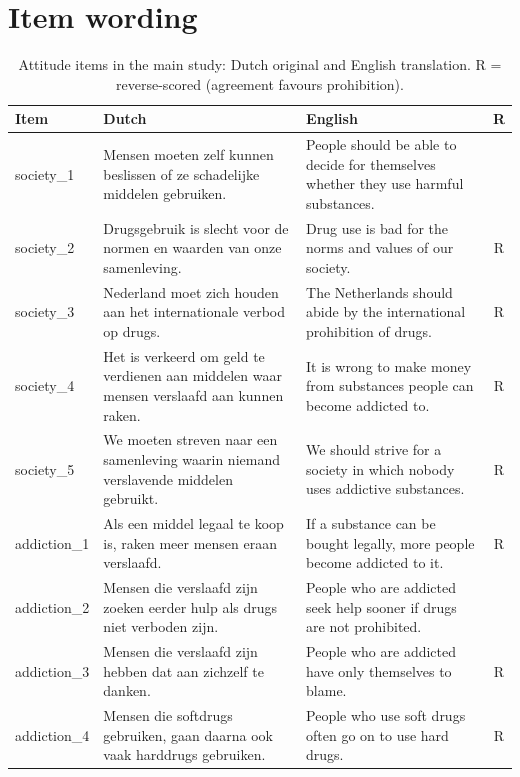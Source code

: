 \section{Item wording}
\label{app:items}

\begin{table}[H]
\centering
\scriptsize
\caption{Attitude items in the main study: Dutch original and English translation. R = reverse-scored
(agreement favours prohibition).}
\begin{tabularx}{\linewidth}{@{}l X X c@{}}
\toprule
Item & Dutch & English & R \\
\midrule
society\_1 & Mensen moeten zelf kunnen beslissen of ze schadelijke middelen gebruiken. & People should be able to decide for themselves whether they use harmful substances. & \\
society\_2 & Drugsgebruik is slecht voor de normen en waarden van onze samenleving. & Drug use is bad for the norms and values of our society. & R \\
society\_3 & Nederland moet zich houden aan het internationale verbod op drugs. & The Netherlands should abide by the international prohibition of drugs. & R \\
society\_4 & Het is verkeerd om geld te verdienen aan middelen waar mensen verslaafd aan kunnen raken. & It is wrong to make money from substances people can become addicted to. & R \\
society\_5 & We moeten streven naar een samenleving waarin niemand verslavende middelen gebruikt. & We should strive for a society in which nobody uses addictive substances. & R \\
\addlinespace
addiction\_1 & Als een middel legaal te koop is, raken meer mensen eraan verslaafd. & If a substance can be bought legally, more people become addicted to it. & R \\
addiction\_2 & Mensen die verslaafd zijn zoeken eerder hulp als drugs niet verboden zijn. & People who are addicted seek help sooner if drugs are not prohibited. & \\
addiction\_3 & Mensen die verslaafd zijn hebben dat aan zichzelf te danken. & People who are addicted have only themselves to blame. & R \\
addiction\_4 & Mensen die softdrugs gebruiken, gaan daarna ook vaak harddrugs gebruiken. & People who use soft drugs often go on to use hard drugs. & R \\

\end{tabularx}
\end{table}
